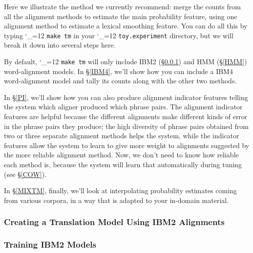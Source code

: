 \documentclass[11pt,letterpaper]{article}
\def\code{\begingroup\catcode`\_=12 \codex}
\newcommand{\codex}[1]{\texttt{#1}\endgroup}
\begin{document}
Here we illustrate the method we currently recommend: merge the counts from all
the alignment methods to estimate the main probability feature, using one
alignment method to estimate a lexical smoothing feature.
You can do all this by typing \code{make tm} in your \code{toy.experiment}
directory, but we will break it down into several steps here.

By default, \code{make tm} will only include IBM2 (\S\ref{IBM2}) and HMM
(\S\ref{HMM}) word-alignment models.  In \S\ref{IBM4}, we'll show how you can
include a IBM4 word-alignment model and tally its counts along with the other
two methods.

In \S\ref{PI}, we'll show how you can also produce alignment indicator features
telling the system which aligner produced which phrase pairs.  The alignment
indicator features are helpful because the different alignments make different
kinds of error in the phrase pairs they produce; the high diversity of phrase
pairs obtained from two or three separate alignment methods helps the system,
while the indicator features allow the system to learn to give more weight to
alignments suggested by the more reliable alignment method.  Now, we don't need
to know how reliable each method is, because the system will learn that
automatically during tuning (see \S\ref{COW}).

In \S\ref{MIXTM}, finally, we'll look at interpolating probability estimates
coming from various corpora, in a way that is adapted to your in-domain
material.

\subsubsection{Creating a Translation Model Using IBM2 Alignments} \label{IBM2}

\subsubsection*{Training IBM2 Models}
\end{document}
